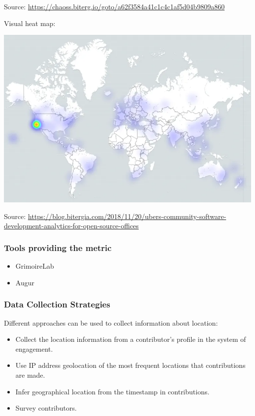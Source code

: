 Source:
\href{https://chaoss.biterg.io/goto/a62f3584a41c1c4c1af5d04b9809a860}{\url{https://chaoss.biterg.io/goto/a62f3584a41c1c4c1af5d04b9809a860}}

Visual heat map:

\includegraphics{images/contributor-location_heatmap.png}

Source:
\href{https://blog.bitergia.com/2018/11/20/ubers-community-software-development-analytics-for-open-source-offices}{\url{https://blog.bitergia.com/2018/11/20/ubers-community-software-development-analytics-for-open-source-offices}}

\hypertarget{tools-providing-the-metric}{%
\subsubsection{Tools providing the
metric}\label{tools-providing-the-metric}}

\begin{itemize}
\tightlist
\item
  GrimoireLab
\item
  Augur
\end{itemize}

\hypertarget{data-collection-strategies}{%
\subsubsection{Data Collection
Strategies}\label{data-collection-strategies}}

Different approaches can be used to collect information about location:

\begin{itemize}
\tightlist
\item
  Collect the location information from a contributor's profile in the
  system of engagement.
\item
  Use IP address geolocation of the most frequent locations that
  contributions are made.
\item
  Infer geographical location from the timestamp in contributions.
\item
  Survey contributors.
\end{itemize}

